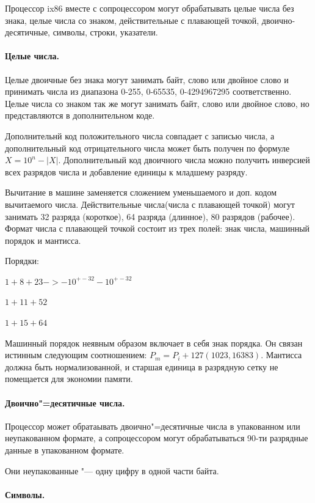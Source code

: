 Процессор ix86 вместе с сопроцессором могут обрабатывать целые числа без знака, целые числа со знаком, действительные с плавающей
точкой, двоично-десятичные, символы, строки, указатели.
\paragraph{Целые числа.}

Целые двоичные без знака могут занимать байт, слово или двойное слово и принимать числа из диапазона 0-255, 0-65535, 0-4294967295
соответственно.
Целые числа со знаком так же могут занимать байт, слово или двойное слово, но представляются в дополнительном коде.

Дополнительнй код положительного числа совпадает с записью числа, а дополнительный код отрицательного числа может быть получен по
формуле $X = 10^n - |X|$.
Дополнительный код двоичного числа можно получить инверсией всех разрядов числа и добавление единицы к младшему разряду.

Вычитание в машине заменяется сложением уменьшаемого и доп. кодом вычитаемого числа. 
Действительные числа(числа с плавающей точкой) могут занимать 32 разряда (короткое), 64 разряда (длинное), 80 разрядов (рабочее).
Формат числа с плавающей точкой состоит из трех полей: знак числа, машинный порядок и мантисса.

Порядки:

$1 + 8 + 23 -> -10^{+-32} - 10^{+-32}$

$1 + 11 + 52$

$1 + 15+ 64$

Машинный порядок неявным образом включает в себя знак порядка. Он связан истинным следующим соотношением: $P_m = P_i + 127(1023, 16383)$.
Мантисса должна быть нормализованной, и старшая единица в разрядную сетку не помещается для экономии памяти.

\paragraph{Двоично"=десятичные числа.}

Процессор может обратаывать двоично"=десятичные числа в упакованном или неупакованном формате, а 
сопроцессором могут обрабатываться 90-ти разрядные данные в упакованном формате.

Они неупакованные "--- одну цифру в одной части байта.

\paragraph{Символы.}

